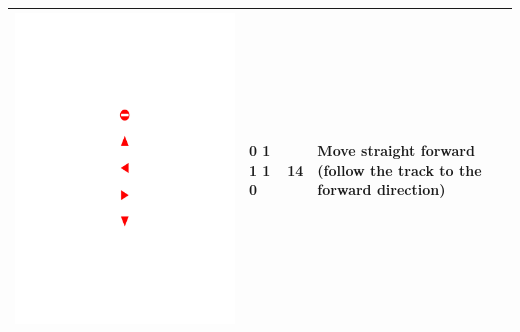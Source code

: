 \begin{table}[!h]
\begin{tabular}{|c|C{2cm}|C{2cm}|C{5cm}|}
		\begin{minipage}{.075\textwidth}\includegraphics[scale=.5,trim=9.1cm 16cm 9.5cm 10.5cm,clip]{signs.pdf}\end{minipage}	& 0 1 1 1 0	& 14 & Move straight forward (follow the track to the forward direction) \\ \hline

\end{tabular}
\end{table}
